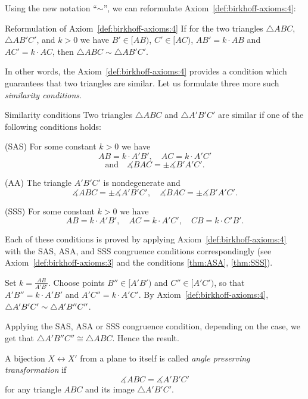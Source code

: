 Using the new notation ``$\sim$'', we can reformulate Axiom~\ref{def:birkhoff-axioms:4}:

\begin{thm}{Reformulation of Axiom~\ref{def:birkhoff-axioms:4}}
If for the two triangles 
$\triangle ABC$, 
$\triangle AB'C'$,
and $k>0$ we have
$B'\in [AB)$,
$C'\in [AC)$,
$AB'=k\cdot AB$ and
$AC'=k\cdot AC$,
then $\triangle ABC\sim\triangle AB'C'$.
\end{thm}

In other words, the Axiom~\ref{def:birkhoff-axioms:4} provides 
a condition which guarantees that two triangles are similar.
Let us formulate three more such {}\emph{similarity conditions}.

\begin{thm}{Similarity conditions}\label{prop:sim}
Two triangles 
$\triangle ABC$ and $\triangle A'B'C'$
are similar if one of the following conditions holds:

(SAS) For some constant $k>0$ we have
$$A B=k\cdot A' B',
\quad 
A C=k\cdot A' C'$$
$$
\text{and}
\quad 
\measuredangle B A C=\pm\measuredangle B' A' C'.$$

(AA) The triangle $A' B' C'$ is nondegenerate
and 
$$\measuredangle A B C
=
\pm\measuredangle A' B' C',
\quad 
\measuredangle B A C
=
\pm\measuredangle B' A' C'.$$

(SSS) For some constant $k>0$ we have
$$A B=k\cdot A' B',
\quad
A C=k\cdot A' C',
\quad
CB=k\cdot C'B'.$$

\end{thm}

Each of these conditions is proved by applying Axiom~\ref{def:birkhoff-axioms:4} with the SAS, ASA, and SSS congruence conditions correspondingly
(see Axiom~\ref{def:birkhoff-axioms:3} and the conditions \ref{thm:ASA}, \ref{thm:SSS}).


Set $k=\tfrac{AB}{A'B'}$.
Choose points $B''\in [A'B')$ and $C''\in [A'C')$,
so that $A'B''=k\cdot A'B'$ and $A'C''=k\cdot A'C'$.
By Axiom~\ref{def:birkhoff-axioms:4},
$\triangle A'B'C'\z\sim \triangle A'B''C''$.

Applying the SAS, ASA or SSS congruence condition, depending on the case, 
we get that $\triangle A'B''C''\cong \triangle ABC$.
Hence the result.
\qeds



A bijection $X\leftrightarrow X'$ from a plane to itself is called \emph{angle preserving transformation} if 
\[\measuredangle ABC= \measuredangle A'B'C'\]
for any triangle $ABC$ and its image $\triangle A'B'C'$.


